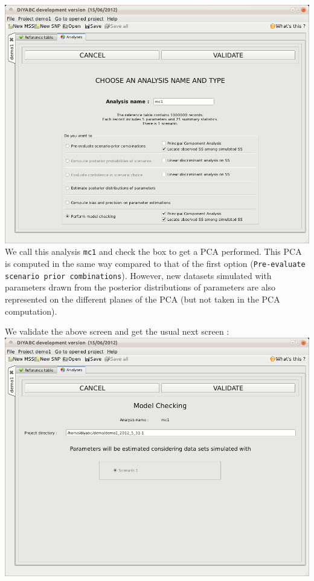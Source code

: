 \includegraphics[scale=0.32]{gui_pictures/Capture-DIYABC-53} \\


We call this analysis \texttt{mc1} and check the box to get a PCA
performed. This PCA is computed in the same way compared to that of
the first option (\texttt{Pre-evaluate scenario prior combinations}).
However, new datasets simulated with parameters drawn from the posterior
distributions of parameters are also represented on the different
planes of the PCA (but not taken in the PCA computation).

We validate the above screen and get the usual next screen :\\


\includegraphics[scale=0.35]{gui_pictures/Capture-DIYABC-54} \\


